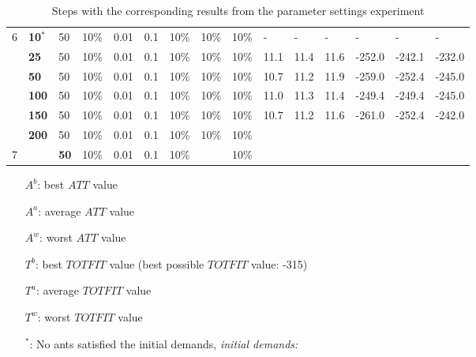 \begin{table}
\begin{tabular}{|l|l|l|l|l|l|l|l|l||l|l|l|l|l|l|}
    \hline
    6 & \textbf{10$^*$} & 50 & 10\% & 0.01 & 0.1 & 10\% & 10\% & 10\% & - & - & - & - & - & - \\
    ~ & \textbf{25} & 50 & 10\% & 0.01 & 0.1 & 10\% & 10\% & 10\% & 11.1 & 11.4 & 11.6 & -252.0 & -242.1 & -232.0 \\
    ~ & \textbf{50} & 50 & 10\% & 0.01 & 0.1 & 10\% & 10\% & 10\% & 10.7 & 11.2 & 11.9 & -259.0 & -252.4 & -245.0 \\
    ~ & \textbf{100} & 50 & 10\% & 0.01 & 0.1 & 10\% & 10\% & 10\% & 11.0 & 11.3 & 11.4 & -249.4 & -249.4 & -245.0 \\
    ~ & \textbf{150} & 50 & 10\% & 0.01 & 0.1 & 10\% & 10\% & 10\% & 10.7 & 11.2 & 11.6 & -261.0 & -252.4 & -242.0 \\
    ~ & \textbf{200} & 50 & 10\% & 0.01 & 0.1 & 10\% & 10\% & 10\% & ~ & ~ & ~ & ~ & ~ & ~ \\
    \hline
    7 & ~ & \textbf{50} & 10\% & 0.01 & 0.1 & 10\% & ~ & 10\% & ~ & ~ & ~ & ~ & ~ & ~  \\
    \hline
    \end{tabular}
    \caption {Steps with the corresponding results from the parameter settings experiment} 
    \begin{itemize}[noitemsep]
    \item[$A^b$:] best $ATT$ value
    \item[$A^a$:] average $ATT$ value
    \item[$A^w$:] worst $ATT$ value
    \item[$T^b$:] best $TOTFIT$ value (best possible $TOTFIT$ value: -315)
    \item[$T^a$:] average $TOTFIT$ value
    \item[$T^w$:] worst $TOTFIT$ value
    \item[$^*$:] No ants satisfied the initial demands, \emph{\color{red} initial demands: }
    \end{itemize}
    \label{table:parameterSettings}
\end{table}

